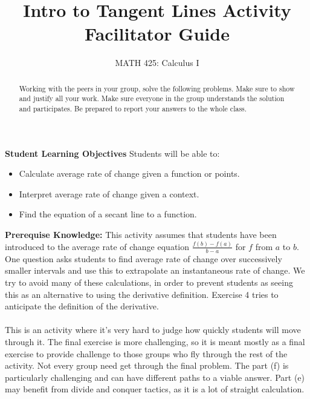 \documentclass{ximera}
\title{Intro to Tangent Lines Activity Facilitator Guide}
\author{MATH 425: Calculus I}
\begin{document}
\begin{abstract}
    Working with the peers in your group, solve the following problems. Make sure to show and justify all your work. Make sure everyone in the group understands the solution and participates. Be prepared to report your answers to the whole class. 
\end{abstract}
\maketitle

\textbf{Student Learning Objectives}
Students will be able to:
\begin{itemize}
  \item Calculate average rate of change given a function or points.
  \item Interpret average rate of change given a context.
  \item Find the equation of a secant line to a function.
\end{itemize}
\textbf{Prerequise Knowledge:} This activity assumes that students have been introduced to the average rate of change equation $\frac{f(b)-f(a)}{b-a}$ for $f$ from $a$ to $b$.  One question asks students to find average rate of change over successively smaller intervals and use this to extrapolate an instantaneous rate of change.  We try to avoid many of these calculations, in order to prevent students as seeing this as an alternative to using the derivative definition. Exercise 4 tries to anticipate the definition of the derivative. \\
\\
This is an activity where it's very hard to judge how quickly students will move through it.  The final exercise is more challenging, so it is meant mostly as a final exercise to provide challenge to those groups who fly through the rest of the activity.  Not every group need get through the final problem.  The part (f) is particularly challenging and can have different paths to a viable answer.  Part (e) may benefit from divide and conquer tactics, as it is a lot of straight calculation.
\end{document}
